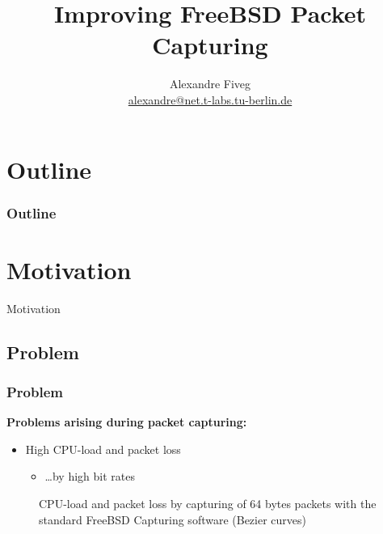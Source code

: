 \documentclass{beamer}
\title{Improving FreeBSD Packet Capturing}
\author[Alexandre Fiveg]{ Alexandre Fiveg \\
\url{alexandre@net.t-labs.tu-berlin.de} }
\institute[TU Berlin/DT Labs]{Technische Universtit\"at Berlin \\ Deutsche Telekom Laboratories}
\begin{document}
\frame{\titlepage}

\section*{Outline}

\begin{frame}
\frametitle{Outline}
\tableofcontents
\end{frame}




\section{Motivation}

\begin{frame}
	\begin{center}
	\huge{Motivation}
	\end{center}
\end{frame}

\subsection*{Problem}
\begin{frame}
\frametitle{Problem}
\textbf{Problems arising during packet capturing:}
\begin{itemize}
	\item High CPU-load and packet loss
		\begin{itemize}
			\item \ldots by high bit rates  \newline
		\end{itemize}
\end{itemize}
\begin{figure}[H] 
	\caption{CPU-load and packet loss by capturing of  64 bytes packets with the standard FreeBSD Capturing software (Bezier curves)}
\end{figure}
\end{frame}
\end{document}
